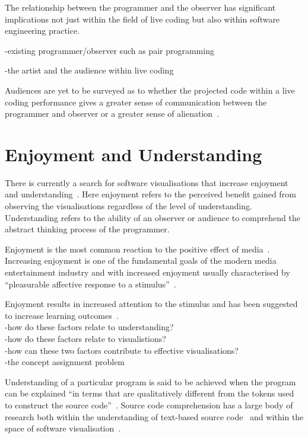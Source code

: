The relationship between the programmer and the observer has significant implications not just within the field of live coding but also within software engineering practice.

-existing programmer/observer such as pair programming

-the artist and the audience within live coding

Audiences are yet to be surveyed as to whether the projected code within a live coding performance gives a greater sense of communication between the programmer and observer or a greater sense of alienation~\cite{Mclean2011}.

\section{Enjoyment and Understanding}

There is currently a search for software visualisations that increase enjoyment and understanding~\cite{McLean2010a}. Here enjoyment refers to the perceived benefit gained from observing the visualisations regardless of the level of understanding. Understanding refers to the ability of an observer or audience to comprehend the abstract thinking process of the programmer.

Enjoyment is the most common reaction to the positive effect of media~\cite{Vorderer2004}. Increasing enjoyment is one of the fundamental goals of the modern media entertainment industry and with increased enjoyment usually characterised by ``pleasurable affective response to a stimulus''~\cite{Brock2004}. 

Enjoyment results in increased attention to the stimulus and has been suggested to increase learning outcomes~.\\
-how do these factors relate to understanding?\\
-how do these factors relate to visualistions?\\
-how can these two factors contribute to effective visualisations?\\
-the concept assignment problem~\cite{Biggerstaff1994}

Understanding of a particular program is said to be achieved when the program can be explained ``in terms that are qualitatively different from the tokens used to construct the source code''~\cite{Biggerstaff1994}. Source code comprehension has a large body of research both within the understanding of text-based source code~ and within the space of software visualisation~\cite{Hosking2005}.


